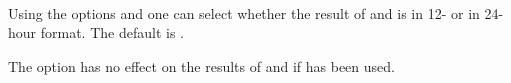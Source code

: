 \begin{Declaration}
  \\
\end{Declaration}%
%
Using the options  and  one can
select whether the result of  and 
is in 12- or in 24-hour format. The default is .%

The option has no effect on the results of
 and  if 
has been used.%

